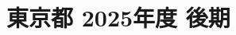 \documentclass[../../hsm_tok_q.tex]{subfiles}
\begin{document}
    \section{東京都 2025年度 後期}
    \subsection{　}
    
    \newpage
    \subsection{　}
    
    \newpage
    \subsection{　}
    
    \newpage
    \subsection{　}
    
    \newpage
    \subsection{　}
    
\end{document}
